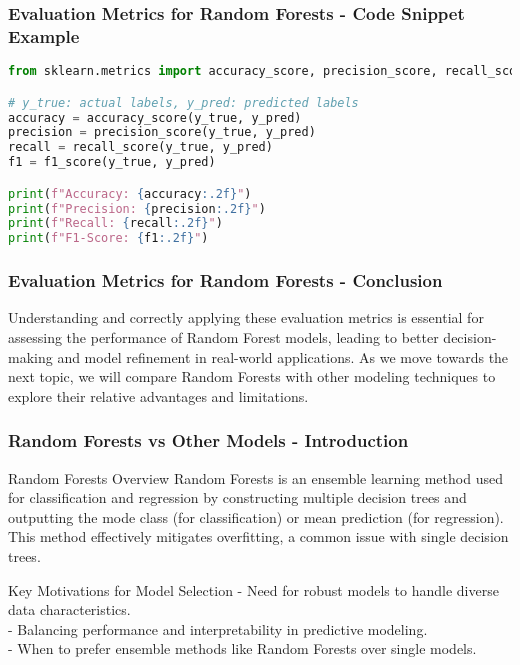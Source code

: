 \documentclass[aspectratio=169]{beamer}
\begin{document}
\begin{frame}[fragile]
    \frametitle{Evaluation Metrics for Random Forests - Code Snippet Example}
    \begin{lstlisting}[language=Python]
from sklearn.metrics import accuracy_score, precision_score, recall_score, f1_score

# y_true: actual labels, y_pred: predicted labels
accuracy = accuracy_score(y_true, y_pred)
precision = precision_score(y_true, y_pred)
recall = recall_score(y_true, y_pred)
f1 = f1_score(y_true, y_pred)

print(f"Accuracy: {accuracy:.2f}")
print(f"Precision: {precision:.2f}")
print(f"Recall: {recall:.2f}")
print(f"F1-Score: {f1:.2f}")
    \end{lstlisting}
\end{frame}

\begin{frame}
    \frametitle{Evaluation Metrics for Random Forests - Conclusion}
    Understanding and correctly applying these evaluation metrics is essential for assessing the performance of Random Forest models, leading to better decision-making and model refinement in real-world applications. 
    As we move towards the next topic, we will compare Random Forests with other modeling techniques to explore their relative advantages and limitations.
\end{frame}

\begin{frame}[fragile]
  \frametitle{Random Forests vs Other Models - Introduction}
  \begin{block}{Random Forests Overview}
    Random Forests is an ensemble learning method used for classification and regression by constructing multiple decision trees and outputting the mode class (for classification) or mean prediction (for regression). This method effectively mitigates overfitting, a common issue with single decision trees.
  \end{block}
  
  \begin{block}{Key Motivations for Model Selection}
    - Need for robust models to handle diverse data characteristics.\\
    - Balancing performance and interpretability in predictive modeling.\\
    - When to prefer ensemble methods like Random Forests over single models.
  \end{block}
\end{frame}
\end{document}
